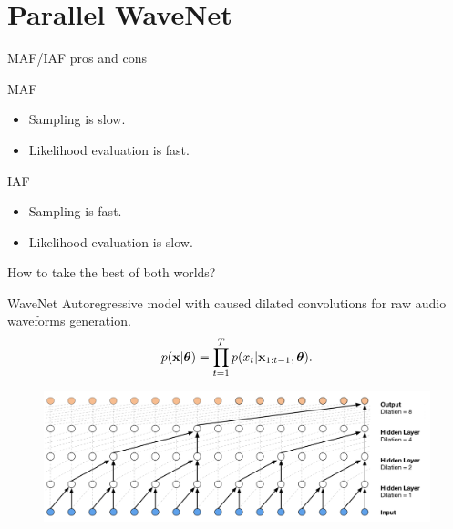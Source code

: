 \section{Parallel WaveNet}
\begin{frame}{MAF/IAF pros and cons}
	\begin{minipage}{0.50\columnwidth}
		\begin{block}{MAF}
			\begin{itemize}
				\item Sampling is slow.
				\item Likelihood evaluation is fast.
			\end{itemize}
		\end{block}
	\end{minipage}%
	\begin{minipage}{0.51\columnwidth}
		\begin{block}{IAF}
			\begin{itemize}
				\item Sampling is fast.
				\item Likelihood evaluation is slow.
			\end{itemize}
		\end{block}
	\end{minipage}
	How to take the best of both worlds?
	\begin{block}{WaveNet}
		Autoregressive model with caused dilated convolutions for raw audio waveforms generation.
		\vspace{-0.5cm}
		\[
			p(\mathbf{x}| \boldsymbol{\theta}) = \prod_{t=1}^T p(x_t|\mathbf{x}_{1:t-1}, \boldsymbol{\theta}).
		\]
		\vspace{-0.7cm}
		\begin{figure}
			\centering
			\includegraphics[width=0.85\linewidth]{figs/wavenet2.png}
		\end{figure}
	\end{block}
\end{frame}
